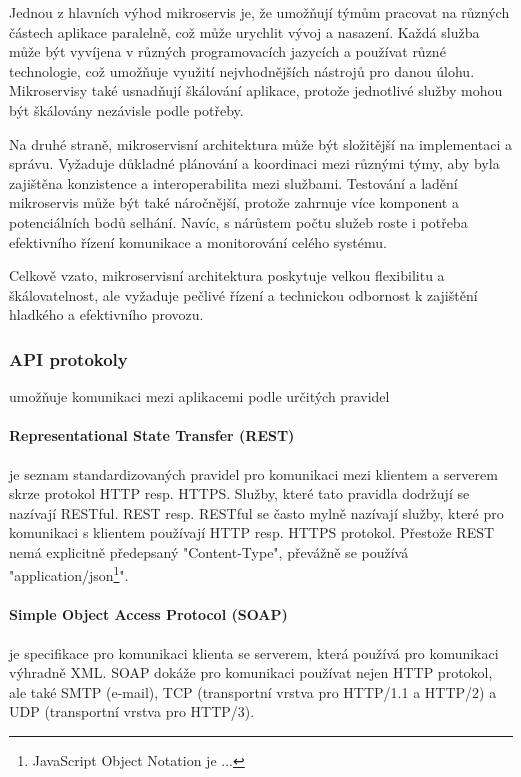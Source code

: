 \documentclass[12pt, a4paper]{article}
\begin{document}
Jednou z hlavních výhod mikroservis je, že umožňují týmům pracovat na různých částech aplikace paralelně, což může urychlit vývoj a nasazení. Každá služba může být vyvíjena v různých programovacích jazycích a používat různé technologie, což umožňuje využití nejvhodnějších nástrojů pro danou úlohu. Mikroservisy také usnadňují škálování aplikace, protože jednotlivé služby mohou být škálovány nezávisle podle potřeby.

Na druhé straně, mikroservisní architektura může být složitější na implementaci a správu. Vyžaduje důkladné plánování a koordinaci mezi různými týmy, aby byla zajištěna konzistence a interoperabilita mezi službami. Testování a ladění mikroservis může být také náročnější, protože zahrnuje více komponent a potenciálních bodů selhání. Navíc, s nárůstem počtu služeb roste i potřeba efektivního řízení komunikace a monitorování celého systému.

Celkově vzato, mikroservisní architektura poskytuje velkou flexibilitu a škálovatelnost, ale vyžaduje pečlivé řízení a technickou odbornost k zajištění hladkého a efektivního provozu.
\subsubsection{API protokoly}
umožňuje komunikaci mezi aplikacemi podle určitých pravidel
\paragraph{Representational State Transfer (REST)}
je seznam standardizovaných pravidel pro komunikaci mezi klientem a serverem skrze protokol HTTP resp. HTTPS. Služby, které tato pravidla dodržují se nazívají RESTful. REST resp. RESTful se často mylně nazívají služby, které pro komunikaci s klientem používají HTTP resp. HTTPS protokol. Přestože REST nemá explicitně předepsaný "Content-Type", převážně se používá "application/json\footnote{JavaScript Object Notation je ...}".
\cite{mozilla_foundation_rest_2023}
\cite{red_hat_inc_what_nodate}
\cite{the_postman_team_what_2023}
\paragraph{Simple Object Access Protocol (SOAP)}
je specifikace pro komunikaci klienta se serverem, která používá pro komunikaci výhradně XML. SOAP dokáže pro komunikaci používat nejen HTTP protokol, ale také SMTP (e-mail), TCP (transportní vrstva pro HTTP/1.1 a HTTP/2) a UDP (transportní vrstva pro HTTP/3).
\cite{the_postman_team_what_2023}
\cite{w3c_xml_protocol_working_group_soap_2007}
\end{document}
